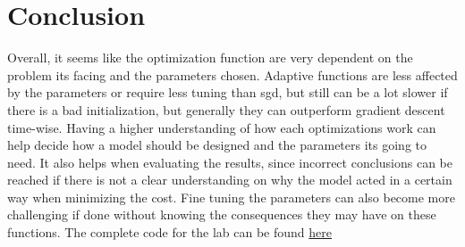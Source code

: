 \documentclass{article}
\begin{document}
\section{Conclusion}
Overall, it seems like the optimization function are very dependent on the problem its facing and the parameters chosen. Adaptive functions are less affected by the parameters or require less tuning than sgd, but still can be a lot slower if there is a bad initialization, but generally they can outperform gradient descent time-wise. Having a higher understanding of how each optimizations work can help decide how a model should be designed and the parameters its going to need. It also helps when evaluating the results, since incorrect conclusions can be reached if there is not a clear understanding on why the model acted in a certain way when minimizing the cost. Fine tuning the parameters can also become more challenging if done without knowing the consequences they may have on these functions. The complete code for the lab can be found \href{https://github.com/sbernal93/dl-labs/tree/master/lab1/autonomous}{here} \\



\end{document}
